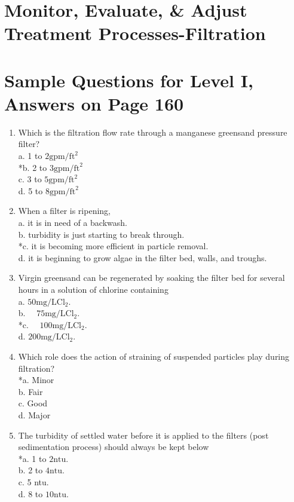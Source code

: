\section{Monitor, Evaluate, \& Adjust Treatment Processes-Filtration}
\section{Sample Questions for Level I, Answers on Page 160}
\begin{enumerate}[label=TI\arabic*]
  \item Which is the filtration flow rate through a manganese greensand pressure filter?\\
a. 1 to $2 \mathrm{gpm} / \mathrm{ft}^{2}$\\
*b. 2 to $3 \mathrm{gpm} / \mathrm{ft}^{2}$\\
c. 3 to $5 \mathrm{gpm} / \mathrm{ft}^{2}$\\
d. 5 to $8 \mathrm{gpm} / \mathrm{ft}^{2}$\\
  \item When a filter is ripening,\\
a. it is in need of a backwash.\\
b. turbidity is just starting to break through.\\
*c. it is becoming more efficient in particle removal.\\
d. it is beginning to grow algae in the filter bed, walls, and troughs.\\
  \item Virgin greensand can be regenerated by soaking the filter bed for several hours in a solution of chlorine containing\\
a. $50 \mathrm{mg} / \mathrm{L} \mathrm{Cl}_{2}$.\\
b. $\quad 75 \mathrm{mg} / \mathrm{L} \mathrm{Cl}_{2}$.\\
*c. $\quad 100 \mathrm{mg} / \mathrm{L} \mathrm{Cl}_{2}$.\\
d. $200 \mathrm{mg} / \mathrm{L} \mathrm{Cl}_{2}$.\\
  \item Which role does the action of straining of suspended particles play during filtration?\\
*a. Minor\\
b. Fair\\
c. Good\\
d. Major\\
  \item The turbidity of settled water before it is applied to the filters (post sedimentation process) should always be kept below\\
*a. 1 to $2 \mathrm{ntu}$.\\
b. 2 to $4 \mathrm{ntu}$.\\
c. 5 ntu.\\
d. 8 to $10 \mathrm{ntu}$.\\
\end{enumerate}
